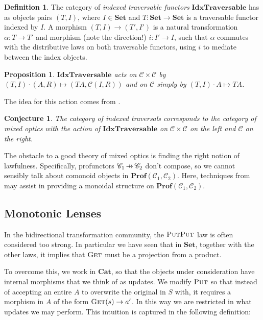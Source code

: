 \documentclass[11pt,letterpaper]{article}
\theoremstyle{plain}
\newtheorem{proposition}[theorem]{Proposition}
\newtheorem{conjecture}[theorem]{Conjecture}
\theoremstyle{definition}
\newtheorem{definition}[theorem]{Definition}
\newcommand{\C}{\mathscr{C}}
\newcommand{\homC}{\underline{\C}}
\newcommand{\Set}{\mathbf{Set}}
\newcommand{\Cat}{\mathbf{Cat}}
\newcommand{\Prof}{\mathbf{Prof}}
\newcommand{\IdxTraversable}{\mathbf{IdxTraversable}}
\newcommand{\fget}{\textsc{Get}}
\newcommand{\fput}{\textsc{Put}}
\newcommand{\hto}{\ensuremath{\,\mathaccent\shortmid\rightarrow\,}}
\begin{document}
\begin{definition}
The category of \emph{indexed traversable functors} $\IdxTraversable$ has as objects pairs $(T, I)$, where $I \in \Set$ and $T : \Set \to \Set$ is a traversable functor indexed by $I$. A morphism $(T, I) \to (T', I')$ is a natural transformation $\alpha : T \to T'$ and morphism (note the direction!) $i : I' \to I$, such that $\alpha$ commutes with the distributive laws on both traversable functors, using $i$ to mediate between the index objects.
\end{definition}

\begin{proposition}
$\IdxTraversable$ acts on $\C \times \C$ by $(T, I) \cdot (A, R) \mapsto (TA, \homC(I, R))$ and on $\C$ simply by $(T, I) \cdot A \mapsto TA$.
\end{proposition}

The idea for this action comes from \cite{IndexedOpticsPost}.

\begin{conjecture}
The category of indexed traversals corresponds to the category of mixed optics with the action of $\IdxTraversable$ on $\C \times \C$ on the left and $\C$ on the right.
\end{conjecture}

The obstacle to a good theory of mixed optics is finding the right notion of lawfulness. Specifically, profunctors $\C_1 \hto \C_2$ don't compose, so we cannot sensibly talk about comonoid objects in $\Prof(\C_1, \C_2)$. Here, techniques from \cite{MonadsNeedNotBeEndofunctors} may assist in providing a monoidal structure on $\Prof(\C_1, \C_2)$.

\subsection{Monotonic Lenses}
In the bidirectional transformation community, the $\fput\fput$ law is often considered too strong. In particular we have seen that in $\Set$, together with the other laws, it implies that $\fget$ must be a projection from a product.

To overcome this, we work in $\Cat$, so that the objects under consideration have internal morphisms that we think of as updates. We modify $\fput$ so that instead of accepting an entire $A$ to overwrite the original in $S$ with, it requires a morphism in $A$ of the form $\fget(s) \to a'$. In this way we are restricted in what updates we may perform. This intuition is captured in the following definition:
\end{document}
